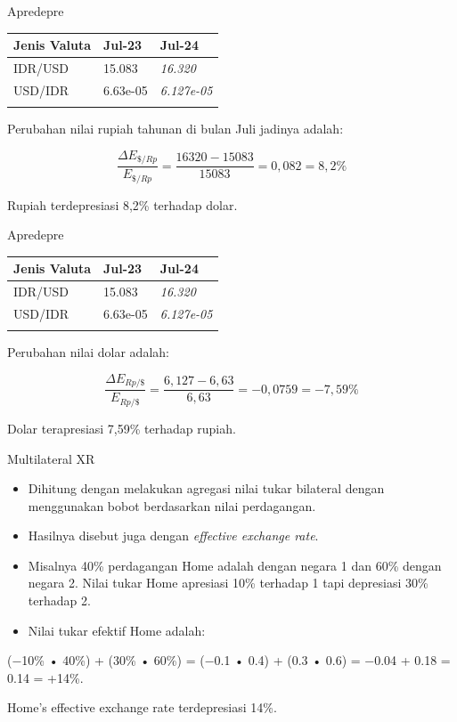 \documentclass[
  ignorenonframetext,
]{beamer}
\begin{document}
\begin{frame}{Apredepre}
\label{apredepre-1}
\begin{longtable}[]{@{}lll@{}}
\toprule\noalign{}
Jenis Valuta & Jul-23 & Jul-24 \\
\midrule\noalign{}
\endhead
IDR/USD & 15.083 & \emph{16.320} \\
USD/IDR & 6.63e-05 & \emph{6.127e-05} \\
\bottomrule\noalign{}
\end{longtable}

Perubahan nilai rupiah tahunan di bulan Juli jadinya adalah:

\begin{equation}
\frac{\Delta E_{\$/Rp}}{E_{\$/Rp}}=\frac{16320-15083}{15083}=0,082=8,2\%
\end{equation}

Rupiah terdepresiasi 8,2\% terhadap dolar.
\end{frame}

\begin{frame}{Apredepre}
\label{apredepre-2}
\begin{longtable}[]{@{}lll@{}}
\toprule\noalign{}
Jenis Valuta & Jul-23 & Jul-24 \\
\midrule\noalign{}
\endhead
IDR/USD & 15.083 & \emph{16.320} \\
USD/IDR & 6.63e-05 & \emph{6.127e-05} \\
\bottomrule\noalign{}
\end{longtable}

Perubahan nilai dolar adalah:

\[
\frac{\Delta E_{Rp/\$}}{E_{Rp/\$}}=\frac{6,127-6,63}{6,63}=-0,0759=-7,59\%
\]

Dolar terapresiasi 7,59\% terhadap rupiah.
\end{frame}

\begin{frame}{Multilateral XR}
\label{multilateral-xr}
\begin{itemize}
\item
  Dihitung dengan melakukan agregasi nilai tukar bilateral dengan
  menggunakan bobot berdasarkan nilai perdagangan.
\item
  Hasilnya disebut juga dengan \emph{effective exchange rate}.
\item
  Misalnya 40\% perdagangan Home adalah dengan negara 1 dan 60\% dengan
  negara 2. Nilai tukar Home apresiasi 10\% terhadap 1 tapi depresiasi
  30\% terhadap 2.
\item
  Nilai tukar efektif Home adalah:
\end{itemize}

(−10\% • 40\%) + (30\% • 60\%) = (−0.1 • 0.4) + (0.3 • 0.6) = −0.04 +
0.18 = 0.14 = +14\%.

Home's effective exchange rate terdepresiasi 14\%.
\end{frame}
\end{document}
